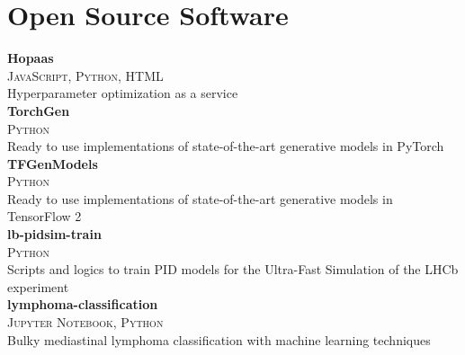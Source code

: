 \newcommand{\pkgname}[1]
  {\normalsize \color{hlcolor-0} \textbf{#1}}

\newcommand{\pkginfo}[1]
  {\small \color{hlcolor-1} \textsc{#1}}
  
\newcommand{\pkgdesc}[1]
  {\normalsize \color{maincolor} {#1}}


\section*{Open Source Software}
\begin{cvcontent}
  \pkgname{Hopaas} \hfill
  \\
  \pkginfo{JavaScript, Python, HTML}\\
  \pkgdesc{Hyperparameter optimization as a service}
  \\ [3mm]
  \pkgname{TorchGen} \hfill
  \\
  \pkginfo{Python}\\
  \pkgdesc{Ready to use implementations of state-of-the-art generative models in PyTorch}
  \\ [3mm]
  \pkgname{TFGenModels} \hfill
  \\
  \pkginfo{Python}\\
  \pkgdesc{Ready to use implementations of state-of-the-art generative models in TensorFlow 2}
  \\ [3mm]
  \pkgname{lb-pidsim-train} \hfill
  \\
  \pkginfo{Python}\\
  \pkgdesc{Scripts and logics to train PID models for the Ultra-Fast Simulation of the LHCb experiment}
  \\ [3mm]
  \pkgname{lymphoma-classification} \hfill
  \\
  \pkginfo{Jupyter Notebook, Python}\\
  \pkgdesc{Bulky mediastinal lymphoma classification with machine learning techniques}

\end{cvcontent}
